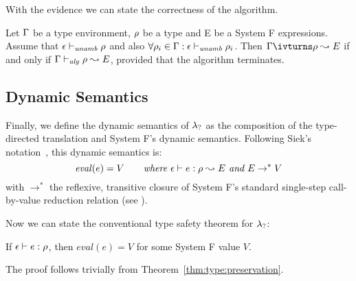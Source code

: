 % 

With the evidence we can state the correctness of the algorithm.
\begin{theorem}
Let $\Gamma$ be a type environment, $\rho$ be a type and E be a System F expressions.
Assume that $\epsilon \vdash_{\mathit{unamb}} \rho$ and also $\forall \rho_i \in \Gamma: \epsilon \vdash_{\mathit{unamb}} \rho_i$.
Then $\tenv \ivturns \rulet \leadsto E$ if and only if $\Gamma \vdash_{\mathit{alg}} \rho \leadsto E$,
provided that the algorithm terminates.
\end{theorem}

\subsection{Dynamic Semantics}
Finally, we define the dynamic semantics of $\lambda_{?}$ as the composition of
the type-directed translation and System F's dynamic semantics.  Following
Siek's notation~\cite{systemfg}, this dynamic semantics is:
\[ \mathit{eval}(e) = V \quad\quad \textit{where } \epsilon \vdash e:\rho \leadsto E \textit{ and } E \rightarrow^* V  \]
with $\rightarrow^*$ the reflexive, transitive closure of System F's standard single-step call-by-value reduction relation (see \cite[Chapter 23]{tapl}).

Now we can state the conventional type safety theorem for $\lambda_{?}$:
\begin{theorem}
If $\epsilon \vdash e:\rho$, then $\mathit{eval}(e) = V$ for
some System F value $V$.
\end{theorem}
The proof follows trivially from Theorem~\ref{thm:type:preservation}.


